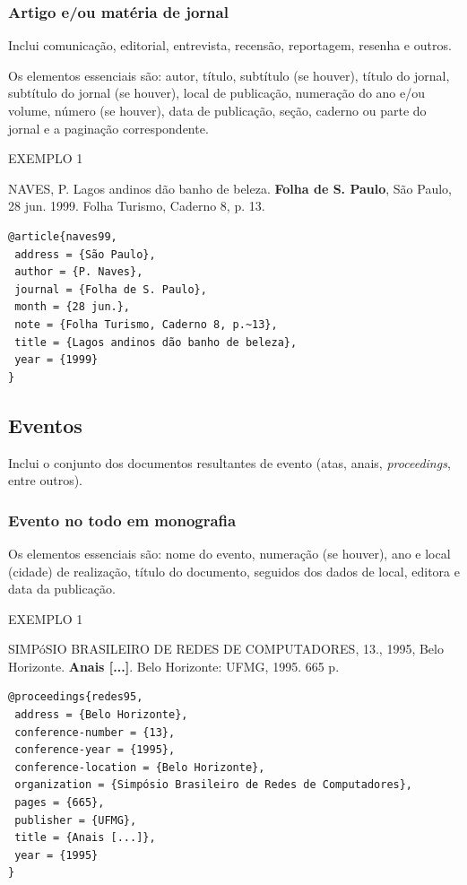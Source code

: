 \subsubsection{Artigo e/ou matéria de jornal}

Inclui comunicação, editorial, entrevista, recensão, reportagem, resenha e outros.

Os elementos essenciais são: autor, título, subtítulo (se houver), título do jornal, subtítulo do jornal (se houver), local de publicação, numeração do ano e/ou volume, número (se houver), data de publicação, seção, caderno ou parte do jornal e a paginação correspondente. 

EXEMPLO 1 

NAVES, P. Lagos andinos dão banho de beleza. \textbf{Folha de S. Paulo}, São Paulo, 28 jun. 1999. Folha Turismo, Caderno 8, p. 13.

\begin{verbatim}
@article{naves99,
 address = {São Paulo},
 author = {P. Naves},
 journal = {Folha de S. Paulo},
 month = {28 jun.},
 note = {Folha Turismo, Caderno 8, p.~13},
 title = {Lagos andinos dão banho de beleza},
 year = {1999}
}
\end{verbatim}

\subsection{Eventos}

Inclui o conjunto dos documentos resultantes de evento (atas, anais, \textit{proceedings}, entre outros).

\subsubsection{Evento no todo em monografia}

Os elementos essenciais são: nome do evento, numeração (se houver), ano e local (cidade) de realização, título do documento, seguidos dos dados de local, editora e data da publicação. 

EXEMPLO 1

SIMPóSIO BRASILEIRO DE REDES DE COMPUTADORES, 13., 1995, Belo Horizonte. \textbf{Anais [...]}. Belo Horizonte: UFMG, 1995. 665 p.

\begin{verbatim}
@proceedings{redes95,
 address = {Belo Horizonte},
 conference-number = {13},
 conference-year = {1995},
 conference-location = {Belo Horizonte},
 organization = {Simpósio Brasileiro de Redes de Computadores},
 pages = {665},
 publisher = {UFMG},
 title = {Anais [...]},
 year = {1995}
}
\end{verbatim}


